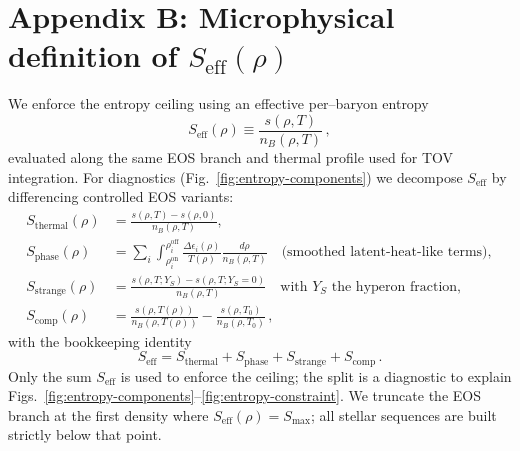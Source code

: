 \documentclass[11pt]{article}
\begin{document}
\section*{Appendix B: Microphysical definition of $S_{\mathrm{eff}}(\rho)$}
We enforce the entropy ceiling using an effective per--baryon entropy
\begin{equation}
S_{\mathrm{eff}}(\rho)\equiv \frac{s(\rho,T)}{n_B(\rho,T)}\,,
\end{equation}
evaluated along the same EOS branch and thermal profile used for TOV integration.
For diagnostics (Fig.~\ref{fig:entropy-components}) we decompose $S_{\mathrm{eff}}$ by differencing controlled EOS variants:
\begin{align}
S_{\text{thermal}}(\rho)&=\frac{s(\rho,T)-s(\rho,0)}{n_B(\rho,T)},\\
S_{\text{phase}}(\rho)&=\sum_i\int_{\rho_i^{\mathrm{on}}}^{\rho_i^{\mathrm{off}}}
\frac{\Delta\epsilon_i(\rho)}{T(\rho)}\frac{d\rho}{n_B(\rho,T)}\quad\text{(smoothed latent-heat-like terms)},\\
S_{\text{strange}}(\rho)&=\frac{s(\rho,T;Y_S)-s(\rho,T;Y_S=0)}{n_B(\rho,T)}\quad\text{with $Y_S$ the hyperon fraction},\\
S_{\text{comp}}(\rho)&=\frac{s(\rho,T(\rho))}{n_B(\rho,T(\rho))}-\frac{s(\rho,T_0)}{n_B(\rho,T_0)}\,,
\end{align}
with the bookkeeping identity
\begin{equation}
S_{\mathrm{eff}}=S_{\text{thermal}}+S_{\text{phase}}+S_{\text{strange}}+S_{\text{comp}}\,.
\end{equation}
Only the sum $S_{\mathrm{eff}}$ is used to enforce the ceiling; the split is a diagnostic to explain Figs.~\ref{fig:entropy-components}--\ref{fig:entropy-constraint}. We truncate the EOS branch at the first density where $S_{\mathrm{eff}}(\rho)=S_{\max}$; all stellar sequences are built strictly below that point.
\end{document}

